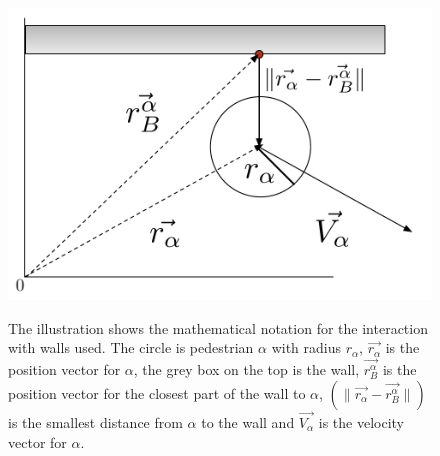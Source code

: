 \begin{figure}[ht]
\centering
{\includegraphics[scale=0.35]{Figures/NotationOfWall.pdf}} 
\caption[Notation of the interaction between an agent and a wall]{The illustration shows the mathematical notation for the interaction with walls used. The circle is pedestrian $\alpha$ with radius $r_{\alpha}$, $\vec{r_{\alpha}}$ is the position vector for $\alpha$, the grey box on the top is the wall, $\vec{r_{B}^{\alpha}}$ is the position vector for the closest part of the wall to $\alpha$, $\left( \| \vec{r_{\alpha}} - \vec{r_{B}^{\alpha}} \| \right)$ is the smallest distance from $\alpha$ to the wall and $\vec{V_{\alpha}}$ is the velocity vector for $\alpha$.}
\label{NotationOfWall}
\end{figure}


